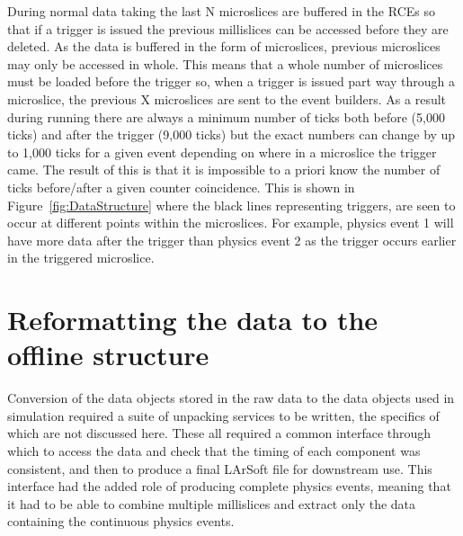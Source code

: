 During normal data taking the last N microslices are buffered in the RCEs so that if a trigger is issued the previous millislices can be accessed before they are deleted. As the data is buffered in the form of microslices, previous microslices may only be accessed in whole. This means that a whole number of microslices must be loaded before the trigger so, when a trigger is issued part way through a microslice, the previous X microslices are sent to the event builders. As a result during running there are always a minimum number of ticks both before (5,000 ticks) and after the trigger (9,000 ticks) but the exact numbers can change by up to 1,000 ticks for a given event depending on where in a microslice the trigger came. The result of this is that it is impossible to a priori know the number of ticks before/after a given counter coincidence. This is shown in Figure~\ref{fig:DataStructure} where the black lines representing triggers, are seen to occur at different points within the microslices. For example, physics event 1 will have more data after the trigger than physics event 2 as the trigger occurs earlier in the triggered microslice.

\section{Reformatting the data to the offline structure} \label{Reformatting the data to the offline structure} %
Conversion of the data objects stored in the raw data to the data objects used in simulation required a suite of unpacking services to be written, the specifics of which are not discussed here. These all required a common interface through which to access the data and check that the timing of each component was consistent, and then to produce a final LArSoft file for downstream use. This interface had the added role of producing complete physics events, meaning that it had to be able to combine multiple millislices and extract only the data containing the continuous physics events. \\

